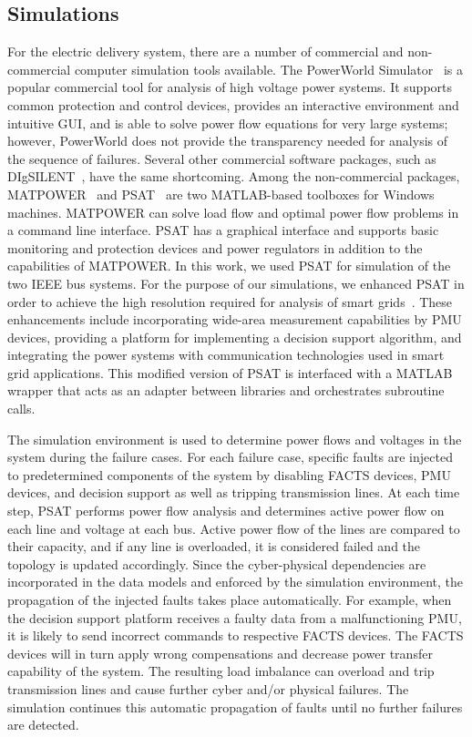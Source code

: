 \documentclass[12pt]{elsarticle}
\begin{document}
\subsection{Simulations}
\label{sec:case_study:sim}
For the electric delivery system, there are a number of commercial and non-commercial computer simulation tools available. The PowerWorld Simulator~\cite{PwrWrld} is a popular commercial tool for analysis of high voltage power systems. It supports common protection and control devices, provides an interactive environment and intuitive GUI, and is able to solve power flow equations for very large systems; however, PowerWorld does not provide the transparency needed for analysis of the sequence of failures. Several other commercial software packages, such as DIgSILENT~\cite{DIg}, have the same shortcoming. Among the non-commercial packages, MATPOWER~\cite{MATPWR} and PSAT~\cite{Mi05} are two MATLAB-based toolboxes for Windows machines. MATPOWER can solve load flow and optimal power flow problems in a command line interface. PSAT has a graphical interface and supports basic monitoring and protection devices and power regulators in addition to the capabilities of MATPOWER. In this work, we used PSAT for simulation of the two IEEE bus systems. For the purpose of our simulations, we enhanced PSAT in order to achieve the high resolution required for analysis of smart grids~\cite{MaS14,MaS18}. These enhancements include incorporating wide-area measurement capabilities by PMU devices, providing a platform for implementing a decision support algorithm, and integrating the power systems with communication technologies used in smart grid applications. This modified version of PSAT is interfaced with a MATLAB wrapper that acts as an adapter between libraries and orchestrates subroutine calls.

The simulation environment is used to determine power flows and voltages in the system during the failure cases. For each failure case, specific faults are injected to predetermined components of the system by disabling FACTS devices, PMU devices, and decision support as well as tripping transmission lines. At each time step, PSAT performs power flow analysis and determines active power flow on each line and voltage at each bus. Active power flow of the lines are compared to their capacity, and if any line is overloaded, it is considered failed and the topology is updated accordingly. Since the cyber-physical dependencies are incorporated in the data models and enforced by the simulation environment, the propagation of the injected faults takes place automatically. For example, when the decision support platform receives a faulty data from a malfunctioning PMU, it is likely to send incorrect commands to respective FACTS devices. The FACTS devices will in turn apply wrong compensations and decrease power transfer capability of the system. The resulting load imbalance can overload and trip transmission lines and cause further cyber and/or physical failures. The simulation continues this automatic propagation of faults until no further failures are detected.
\end{document}

